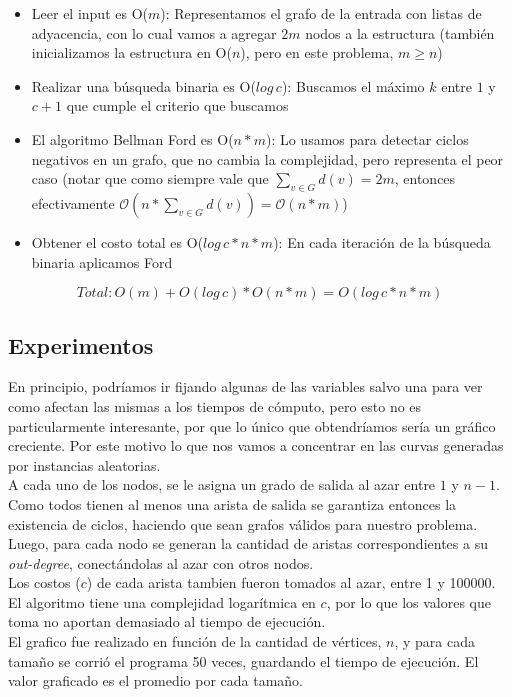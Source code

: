 \begin{itemize}
	\item Leer el input es O($m$): Representamos el grafo de la entrada con listas de adyacencia, con lo cual vamos a agregar $2m$ nodos a la estructura (también inicializamos la estructura en O($n$), pero en este problema, $m \geq n$)
	\item Realizar una búsqueda binaria es O($log \, c$): Buscamos el máximo $k$ entre $1$ y $c+1$ que cumple el criterio que buscamos
	\item El algoritmo Bellman Ford es O($n*m$): Lo usamos para detectar ciclos negativos en un grafo, que no cambia la complejidad, pero representa el peor caso (notar que como siempre vale que $\sum_{v \in G} d(v) = 2m$, entonces efectivamente $\mathcal{O}(n*\sum_{v \in G} d(v)) = \mathcal{O}(n*m)$)
	\item Obtener el costo total es O($log \, c *n*m$): En cada iteración de la búsqueda binaria aplicamos Ford
\end{itemize}

$$Total:  O(m) + O(log \, c) * O(n*m) = O(log \, c *n*m) $$

\subsection{Experimentos}

En principio, podríamos ir fijando algunas de las variables salvo una para ver como afectan las mismas a los tiempos de cómputo, pero esto no es particularmente interesante, por que lo único que obtendríamos sería un gráfico creciente. Por este motivo lo que nos vamos a concentrar en las curvas generadas por instancias aleatorias. \\

A cada uno de los nodos, se le asigna un grado de salida al azar entre $1$ y $n-1$. Como todos tienen al menos una arista de salida se garantiza entonces la existencia de ciclos, haciendo que sean grafos válidos para nuestro problema. Luego, para cada nodo se generan la cantidad de aristas correspondientes a su \textit{out-degree}, conectándolas al azar con otros nodos. \\

Los costos ($c$) de cada arista tambien fueron tomados al azar, entre 1 y 100000. El algoritmo tiene una complejidad logarítmica en $c$, por lo que los valores que toma no aportan demasiado al tiempo de ejecución. \\

El grafico fue realizado en función de la cantidad de vértices, $n$, y para cada tamaño se corrió el programa 50 veces,
guardando el tiempo de ejecución. El valor graficado es el promedio por cada tamaño. \\

